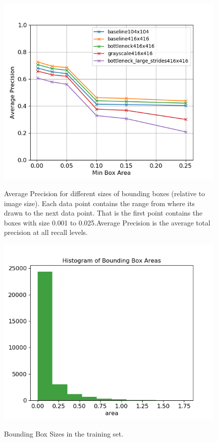 \documentclass{article}
\begin{document}
\begin{figure}[htbp]
	\centering
	\begin{minipage}{0.45\textwidth}
		\includegraphics[width=\linewidth]{area}
		\label{fig:area}
		\caption{Average Precision for different sizes of bounding boxes (relative to image size). Each data point contains the range from where its drawn to the next data point. That is the first point contains the boxes with size 0.001 to 0.025.Average Precision is the average total precision at all recall levels.}
	\end{minipage}
\hfill
	\begin{minipage}{0.45\textwidth}
				\includegraphics[width=\linewidth]{hist_training}
	\label{fig:hist}
	\caption{Bounding Box Sizes in the training set.}
	\end{minipage}

\end{figure}
\end{document}
